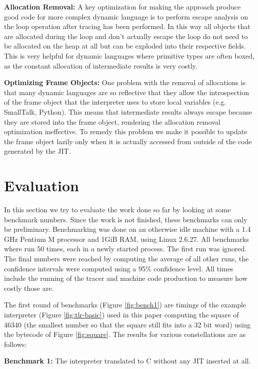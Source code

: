 \documentclass{acm_proc_article-sp}
\begin{document}
\textbf{Allocation Removal:} A key optimization for making the approach
produce good code for more complex dynamic language is to perform escape
analysis on the loop operation after tracing has been performed. In this way all
objects that are allocated during the loop and don't actually escape the loop do
not need to be allocated on the heap at all but can be exploded into their
respective fields.  This is very helpful for dynamic languages where primitive
types are often boxed, as the constant allocation of intermediate results is
very costly.

\textbf{Optimizing Frame Objects:} One problem with the removal of allocations
is that many dynamic languages are so reflective that they allow the
introspection of the frame object that the interpreter uses to store local
variables (e.g. SmallTalk, Python). This means that intermediate results always
escape because they are stored into the frame object, rendering the allocation
removal optimization ineffective. To remedy this problem we make it possible to
update the frame object lazily only when it is actually accessed from outside of
the code generated by the JIT.

\section{Evaluation}
\label{sect:evaluation}

In this section we try to evaluate the work done so far by looking at some
benchmark numbers. Since the work is not finished, these benchmarks can only be
preliminary. Benchmarking was done on an otherwise idle machine with a 1.4
GHz Pentium M processor and 1GiB RAM, using Linux 2.6.27. All benchmarks where
run 50 times, each in a newly started process. The first run was ignored. The
final numbers were reached by computing the average of all other runs, the
confidence intervals were computed using a 95\% confidence level. All times
include the running of the tracer and machine code production to measure how
costly those are.

The first round of benchmarks (Figure \ref{fig:bench1}) are timings of the
example interpreter (Figure \ref{fig:tlr-basic}) used in this paper computing
the square of 46340 (the smallest number so that the square still fits into a 32
bit word) using the bytecode of Figure \ref{fig:square}. The results for various
constellations are as follows:

\textbf{Benchmark 1:} The interpreter translated to C without any JIT inserted at all.
\end{document}
